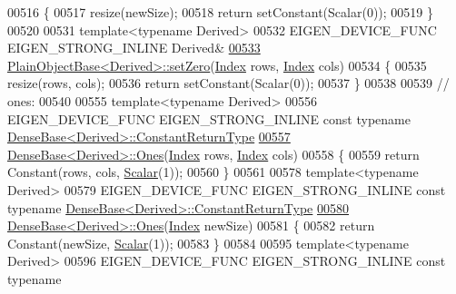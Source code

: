 \begin{DoxyCode}
00516 \{
00517   resize(newSize);
00518   \textcolor{keywordflow}{return} setConstant(Scalar(0));
00519 \}
00520 
00531 \textcolor{keyword}{template}<\textcolor{keyword}{typename} Derived>
00532 EIGEN\_DEVICE\_FUNC EIGEN\_STRONG\_INLINE Derived&
\hyperlink{class_eigen_1_1_plain_object_base_a4f7022ad80446854a068d4d3bfa98446}{00533} \hyperlink{class_eigen_1_1_plain_object_base_ac21ad5f989f320e46958b75ac8d9a1da}{PlainObjectBase<Derived>::setZero}(\hyperlink{namespace_eigen_a62e77e0933482dafde8fe197d9a2cfde}{Index} rows, 
      \hyperlink{namespace_eigen_a62e77e0933482dafde8fe197d9a2cfde}{Index} cols)
00534 \{
00535   resize(rows, cols);
00536   \textcolor{keywordflow}{return} setConstant(Scalar(0));
00537 \}
00538 
00539 \textcolor{comment}{// ones:}
00540 
00555 \textcolor{keyword}{template}<\textcolor{keyword}{typename} Derived>
00556 EIGEN\_DEVICE\_FUNC EIGEN\_STRONG\_INLINE \textcolor{keyword}{const} \textcolor{keyword}{typename} 
      \hyperlink{group___core___module_class_eigen_1_1_cwise_nullary_op}{DenseBase<Derived>::ConstantReturnType}
\hyperlink{group___core___module_adb1ce2c904a1eb3f3bab81ced1b916b6}{00557} \hyperlink{group___core___module_a1284a38971d817c33e40c226f6347e37}{DenseBase<Derived>::Ones}(\hyperlink{namespace_eigen_a62e77e0933482dafde8fe197d9a2cfde}{Index} rows, \hyperlink{namespace_eigen_a62e77e0933482dafde8fe197d9a2cfde}{Index} cols)
00558 \{
00559   \textcolor{keywordflow}{return} Constant(rows, cols, \hyperlink{group___core___module_a5feed465b3a8e60c47e73ecce83e39a2}{Scalar}(1));
00560 \}
00561 
00578 \textcolor{keyword}{template}<\textcolor{keyword}{typename} Derived>
00579 EIGEN\_DEVICE\_FUNC EIGEN\_STRONG\_INLINE \textcolor{keyword}{const} \textcolor{keyword}{typename} 
      \hyperlink{group___core___module_class_eigen_1_1_cwise_nullary_op}{DenseBase<Derived>::ConstantReturnType}
\hyperlink{group___core___module_aef6ca489dc447631fe874c8071ee7edd}{00580} \hyperlink{group___core___module_a1284a38971d817c33e40c226f6347e37}{DenseBase<Derived>::Ones}(\hyperlink{namespace_eigen_a62e77e0933482dafde8fe197d9a2cfde}{Index} newSize)
00581 \{
00582   \textcolor{keywordflow}{return} Constant(newSize, \hyperlink{group___core___module_a5feed465b3a8e60c47e73ecce83e39a2}{Scalar}(1));
00583 \}
00584 
00595 \textcolor{keyword}{template}<\textcolor{keyword}{typename} Derived>
00596 EIGEN\_DEVICE\_FUNC EIGEN\_STRONG\_INLINE \textcolor{keyword}{const} \textcolor{keyword}{typename} 

\end{DoxyCode}
